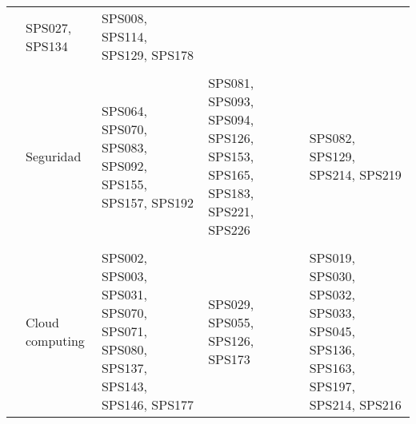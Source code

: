 \begin{longtable}{c Z Y Y Y}
& SPS027, SPS134 & SPS008, SPS114, SPS129, SPS178 \\\\ & Seguridad & SPS064, SPS070, SPS083, SPS092, SPS155, SPS157, SPS192 & SPS081, SPS093, SPS094, SPS126, SPS153, SPS165, SPS183, SPS221, SPS226 & SPS082, SPS129, SPS214, SPS219 \\\\ & Cloud computing & SPS002, SPS003, SPS031, SPS070, SPS071, SPS080, SPS137, SPS143, SPS146, SPS177 & SPS029, SPS055, SPS126, SPS173 & SPS019, SPS030, SPS032, SPS033, SPS045, SPS136, SPS163, SPS197, SPS214, SPS216 \\ \bottomrule
\end{longtable}

\twocolumn
